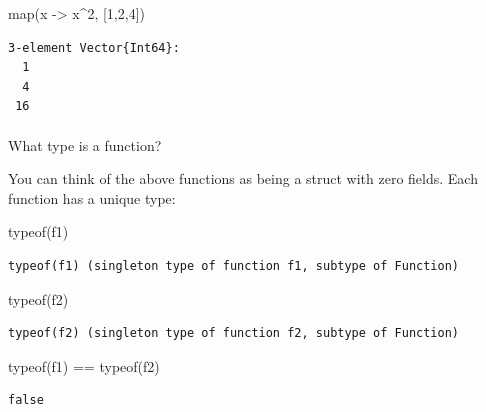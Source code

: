 \documentclass[
]{article}
\makeatletter
\let\oldparagraph\paragraph
\renewcommand{\paragraph}{
    \@ifstar
      \xxxParagraphStar
      \xxxParagraphNoStar
  }
\newcommand{\xxxParagraphStar}[1]{\oldparagraph*{#1}\mbox{}}
\newcommand{\xxxParagraphNoStar}[1]{\oldparagraph{#1}\mbox{}}
\newenvironment{Shaded}{\begin{snugshade}}{\end{snugshade}}
\newcommand{\FloatTok}[1]{\textcolor[rgb]{0.68,0.00,0.00}{#1}}
\newcommand{\FunctionTok}[1]{\textcolor[rgb]{0.28,0.35,0.67}{#1}}
\newcommand{\NormalTok}[1]{\textcolor[rgb]{0.00,0.23,0.31}{#1}}
\newcommand{\OperatorTok}[1]{\textcolor[rgb]{0.37,0.37,0.37}{#1}}
\makeatother
\begin{document}
\begin{Shaded}
\begin{Highlighting}[]
\FunctionTok{map}\NormalTok{(x }\OperatorTok{{-}\textgreater{}}\NormalTok{ x}\OperatorTok{\^{}}\FloatTok{2}\NormalTok{, [}\FloatTok{1}\NormalTok{,}\FloatTok{2}\NormalTok{,}\FloatTok{4}\NormalTok{])}
\end{Highlighting}
\end{Shaded}

\begin{verbatim}
3-element Vector{Int64}:
  1
  4
 16
\end{verbatim}

\paragraph{What type is a function?}\label{what-type-is-a-function}

You can think of the above functions as being a struct with zero fields.
Each function has a unique type:

\begin{Shaded}
\begin{Highlighting}[]
\FunctionTok{typeof}\NormalTok{(f1)}
\end{Highlighting}
\end{Shaded}

\begin{verbatim}
typeof(f1) (singleton type of function f1, subtype of Function)
\end{verbatim}

\begin{Shaded}
\begin{Highlighting}[]
\FunctionTok{typeof}\NormalTok{(f2)}
\end{Highlighting}
\end{Shaded}

\begin{verbatim}
typeof(f2) (singleton type of function f2, subtype of Function)
\end{verbatim}

\begin{Shaded}
\begin{Highlighting}[]
\FunctionTok{typeof}\NormalTok{(f1) }\OperatorTok{==} \FunctionTok{typeof}\NormalTok{(f2)}
\end{Highlighting}
\end{Shaded}

\begin{verbatim}
false
\end{verbatim}
\end{document}
